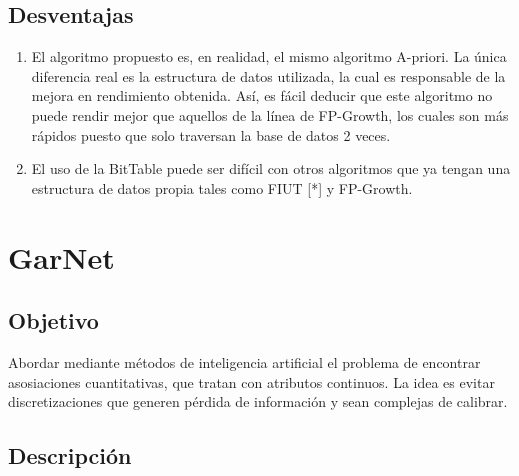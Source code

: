 \documentclass[12pt,spanish]{article}
\begin{document}
\subsection{Desventajas}

\begin{enumerate}
\item El algoritmo propuesto es, en realidad, el mismo algoritmo A-priori. La única diferencia real es la estructura de datos utilizada, la cual es responsable de la mejora en rendimiento obtenida. Así, es fácil deducir que este algoritmo no puede rendir mejor que aquellos de la línea de FP-Growth, los cuales son más rápidos puesto que solo traversan la base de datos 2 veces.
\item El uso de la BitTable puede ser difícil con otros algoritmos que ya tengan una estructura de datos propia tales como FIUT [*] y FP-Growth.
\end{enumerate}

\section{GarNet}

\subsection{Objetivo}

Abordar mediante m\'etodos de inteligencia artificial el problema de encontrar asosiaciones cuantitativas, que tratan con atributos continuos. La idea es evitar discretizaciones que generen p\'erdida de informaci\'on y sean complejas de calibrar.

\subsection{Descripción}
\end{document}
